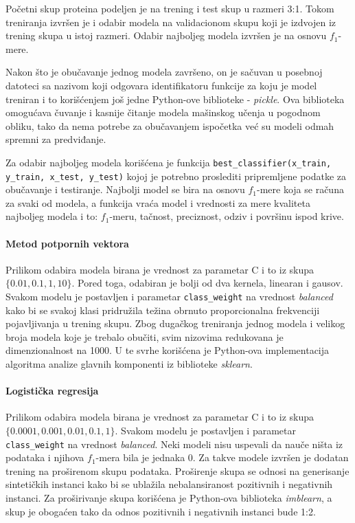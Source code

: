 Početni skup proteina podeljen je na trening i test skup u razmeri 3:1. Tokom treniranja izvršen je i odabir modela na validacionom skupu koji je izdvojen iz trening skupa u istoj razmeri. Odabir najboljeg modela izvršen je na osnovu $f_1$-mere.

Nakon što je obučavanje jednog modela završeno, on je sačuvan u posebnoj datoteci sa nazivom koji odgovara identifikatoru funkcije za koju je model treniran i to korišćenjem još jedne Python-ove biblioteke - \textit{pickle}. Ova biblioteka omogućava čuvanje i kasnije čitanje modela mašinskog učenja u pogodnom obliku, tako da nema potrebe za obučavanjem ispočetka već su modeli odmah spremni za predviđanje.

Za odabir najboljeg modela korišćena je funkcija \verb|best_classifier(x_train,| \\ \verb|y_train, x_test, y_test)| kojoj je potrebno proslediti pripremljene podatke za obučavanje i testiranje. Najbolji model se bira na osnovu $f_1$-mere koja se računa za svaki od modela, a funkcija vraća model i vrednosti za mere kvaliteta najboljeg modela i to: $f_1$-meru, tačnost, preciznost, odziv i površinu ispod krive.


\paragraph{Metod potpornih vektora}

Prilikom odabira modela birana je vrednost za parametar C i to iz skupa $\{0.01, 0.1, 1, 10\}$. Pored toga, odabiran je bolji od dva kernela, linearan i gausov. Svakom modelu je postavljen i parametar \verb|class_weight| na vrednost \textit{balanced} kako bi se svakoj klasi pridružila težina obrnuto proporcionalna frekvenciji pojavljivanja u trening skupu. Zbog dugačkog treniranja jednog modela i velikog broja modela koje je trebalo obučiti, svim nizovima redukovana je dimenzionalnost na 1000. U te svrhe korišćena je Python-ova implementacija algoritma analize glavnih komponenti iz biblioteke \textit{sklearn}.  



\paragraph{Logistička regresija}

Prilikom odabira modela birana je vrednost za parametar C i to iz skupa $\{0.0001, 0.001, 0.01, 0.1, 1\}$. Svakom modelu je postavljen i parametar \verb|class_weight| na vrednost \textit{balanced}. Neki modeli nisu uspevali da nauče ništa iz podataka i njihova $f_1$-mera bila je jednaka 0. Za takve modele izvršen je dodatan trening na proširenom skupu podataka. Proširenje skupa se odnosi na generisanje sintetičkih instanci kako bi se ublažila nebalansiranost pozitivnih i negativnih instanci. Za proširivanje skupa korišćena je Python-ova biblioteka \textit{imblearn}, a skup je obogaćen tako da odnos pozitivnih i negativnih instanci bude 1:2.


